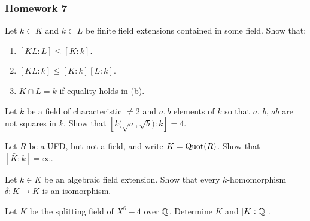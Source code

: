 \subsubsection{Homework 7}
\begin{problem}
  Let $k\subset K$ and $k\subset L$ be finite field extensions
  contained in some field. Show that:
  \begin{enumerate}[label=(\alph*),noitemsep]
  \item $[KL:L]\leq[K:k]$.
  \item $[KL:k]\leq[K:k][L:k]$.
  \item $K\cap L=k$ if equality holds in (b).
  \end{enumerate}
\end{problem}
\begin{solution}
\end{solution}

\begin{problem}
  Let $k$ be a field of characteristic $\neq 2$ and $a,b$ elements of
  $k$ so that $a$, $b$, $ab$ are not squares in $k$. Show that
  $\left[k{\bigl(\sqrt{a},\sqrt{b}\bigr)}:k\right]=4$.
\end{problem}
\begin{solution}
\end{solution}

\begin{problem}
  Let $R$ be a UFD, but not a field, and write $ K=\operatorname{Quot}(R)$. Show
  that $[\bar K:k]=\infty$.
\end{problem}
\begin{solution}
\end{solution}

\begin{problem}
  Let $k\in K$ be an algebraic field extension. Show that every
  $k$-homomorphism $\delta\colon K\to K$ is an isomorphism.
\end{problem}
\begin{solution}
\end{solution}

\begin{problem}
  Let $ K$ be the splitting field of $X^6-4$ over $\mathbb{Q}$. Determine
  $ K$ and $[ K:\mathbb{Q}]$.
\end{problem}
\begin{solution}
\end{solution}

